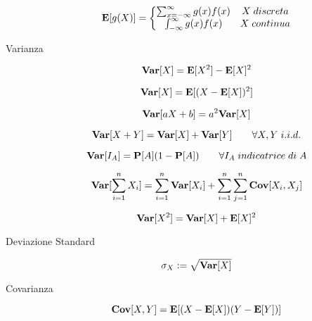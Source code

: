\begin{description}
		\begin{equation}
		\mathbf{E}[g(X)] = \left\{\begin{matrix}
		\sum_{x=-\infty}^{\infty} g(x) f(x) & X \; discreta \\
		\int_{-\infty}^{\infty} g(x) f(x) & X \; continua
		\end{matrix}\right.
		\end{equation}
		
	\item [Varianza]
		\begin{equation}
		\mathbf{Var}[X] = \mathbf{E}[X^{2}]-\mathbf{E}[X]^{2}
		\end{equation}

		\begin{equation}
		\mathbf{Var}[X] = \mathbf{E}[(X-\mathbf{E}[X])^{2}]
		\end{equation}
		
		\begin{equation}
		\mathbf{Var}[aX+b] = a^{2}\mathbf{Var}[X]
		\end{equation}
		
		\begin{equation}
		\mathbf{Var}[X+Y] = \mathbf{Var}[X]+\mathbf{Var}[Y] \qquad\forall X,Y \; i.i.d.
		\end{equation}
		
		\begin{equation}
		\mathbf{Var}[I_{A}] = \mathbf{P}[A](1-\mathbf{P}[A]) \qquad\forall I_{A} \; indicatrice \; di \; A
		\end{equation}
		
		\begin{equation}
		\mathbf{Var}[\sum_{i=1}^{n}X_{i}] = \sum_{i=1}^{n}\mathbf{Var}[X_{i}] + \sum_{i=1}^{n}\sum_{j=1}^{n}\mathbf{Cov}[X_{i},X_{j}]
		\end{equation}
		
		\begin{equation}
		\mathbf{Var}[X^{2}] = \mathbf{Var}[X]+\mathbf{E}[X]^{2}
		\end{equation}
	
	\item [Deviazione Standard]
		\begin{equation}
		\sigma_{X} := \sqrt{\mathbf{Var}[X]}
		\end{equation}
	
	\item [Covarianza]
		\begin{equation}
		\mathbf{Cov}[X,Y] = \mathbf{E}[(X-\mathbf{E}[X])(Y-\mathbf{E}[Y])]
		\end{equation}
		

\end{description}
